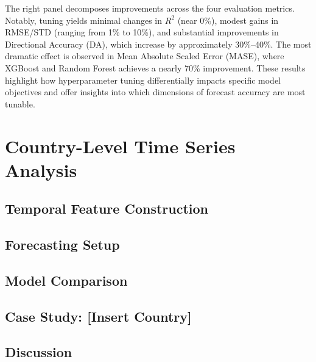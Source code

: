 \documentclass[12pt]{article}
\begin{document}
The right panel decomposes improvements across the four evaluation metrics. Notably, tuning yields minimal changes in $R^2$ (near 0\%), modest gains in RMSE/STD (ranging from 1\% to 10\%), and substantial improvements in Directional Accuracy (DA), which increase by approximately 30\%--40\%. The most dramatic effect is observed in Mean Absolute Scaled Error (MASE), where XGBoost and Random Forest achieves a nearly 70\% improvement. 
These results highlight how hyperparameter tuning differentially impacts specific model objectives and offer insights into which dimensions of forecast accuracy are most tunable.



\section{Country-Level Time Series Analysis}

\subsection{Temporal Feature Construction}

\subsection{Forecasting Setup}

\subsection{Model Comparison}

\subsection{Case Study: [Insert Country]}

\subsection{Discussion}
\end{document}
